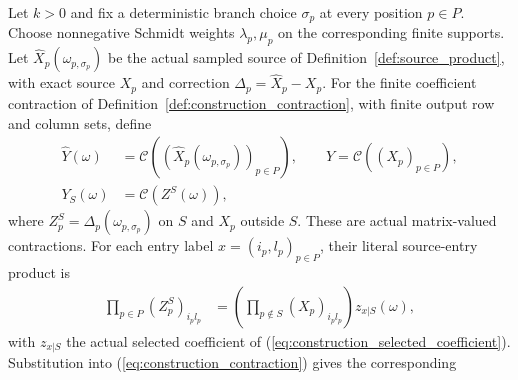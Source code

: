 \begin{theorem}
    \label{thm:construction_gaussian_contraction}
    \leanok
    Let $k>0$ and fix a deterministic branch choice $\sigma_p$ at
    every position $p\in P$. Choose nonnegative Schmidt weights
    $\lambda_p,\mu_p$ on the corresponding finite supports.
    Let $\widehat X_p(\omega_{p,\sigma_p})$ be the actual sampled
    source of Definition~\ref{def:source_product}, with exact source
    $X_p$ and correction $\Delta_p=\widehat X_p-X_p$.
    For the finite coefficient contraction of
    Definition~\ref{def:construction_contraction}, with finite output
    row and column sets, define
    \begin{align}
        \widehat Y(\omega)
                    & =\mathcal C((\widehat X_p(\omega_{p,\sigma_p}))_{p\in P}),
        \qquad Y=\mathcal C((X_p)_{p\in P}),
        \label{eq:construction_sampled_output}                                   \\
        Y_S(\omega) & =\mathcal C(Z^S(\omega)),
        \label{eq:construction_corrected_output}
    \end{align}
    where $Z^S_p=\Delta_p(\omega_{p,\sigma_p})$ on $S$ and $X_p$
    outside $S$. These are actual matrix-valued contractions.
    For each entry label $x=(i_p,l_p)_{p\in P}$, their literal
    source-entry product is
    \begin{align}
        \prod_{p\in P}(Z^S_p)_{i_pl_p}
         & =\left(\prod_{p\notin S}(X_p)_{i_pl_p}\right)
        z_{x|S}(\omega),
        \label{eq:construction_corrected_entry_factorization}
    \end{align}
    with $z_{x|S}$ the actual selected coefficient of
    (\ref{eq:construction_selected_coefficient}). Substitution into
    (\ref{eq:construction_contraction}) gives the corresponding

\end{theorem}
